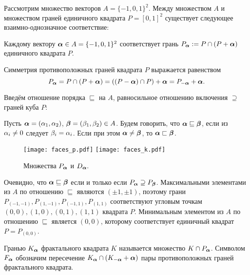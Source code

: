 Рассмотрим множество векторов $A=\{-1,0,1\}^2$.
Между множеством $A$ и множеством граней единичного квадрата $P=[0,1]^2$ существует следующее взаимно-однозначное соответствие:

\begin{definition}\label{dfn:Pa}
Каждому вектору ${\bm{\alpha}}\in A=\{-1,0,1\}^2$ соответствует грань $P_{\bm{\alpha}}:=P\cap(P+{\bm{\alpha}})$ единичного квадрата $P$.
\end{definition}

Симметрия противоположных граней квадрата $P$ выражается равенством 
$$P_{\bm{\alpha}}=P\cap(P+{\bm{\alpha}})=((P-{\bm{\alpha}})\cap P)+{\bm{\alpha}}=P_{-{\bm{\alpha}}}+{\bm{\alpha}}.$$


Введём отношение порядка $\sqsubseteq$ на $A$, равносильное отношению включения $\supseteq$ граней куба $P$:

\begin{definition}\label{Aorder}
Пусть ${\bm{\alpha}}=(\alpha_1,\alpha_2)$, ${\bm{\beta}}=(\beta_1,\beta_2)\in A$.
Будем говорить, что ${\bm{\alpha}}\sqsubseteq{\bm{\beta}}$, если из $\alpha_i\neq 0$ следует $\beta_i=\alpha_i$.
Если при этом ${\bm{\alpha}}\neq{\bm{\beta}}$, то ${\bm{\alpha}}\sqsubset{\bm{\beta}}$.
\end{definition}

\begin{figure}[h!]
 \centering
 \texttt{[image: faces\_p.pdf]}
 \hfill
 \texttt{[image: faces\_k.pdf]}
 \caption{Множества $P_{\bm{\alpha}}$ и $D_{\bm{\alpha}}.$}
 \label{fig:faces}
\end{figure}

Очевидно, что ${\bm{\alpha}}\sqsubseteq{\bm{\beta}}$ если и только если $P_{\bm{\alpha}}\supseteq P_{\bm{\beta}}$. 
Максимальными элементами из $A$ по отношению $\sqsubseteq$ являются $(\pm 1,\pm 1)$, поэтому грани $P_{(-1,-1)}, P_{(1,-1)}, P_{(-1,1)}, P_{(1,1)}$ соответствуют угловым точкам $(0,0), (1,0), (0,1), (1,1)$ квадрата $P$.
Минимальным элементом из $A$ по отношению $\sqsubseteq$ является $(0,0)$, которому соответствует единичный квадрат $P=P_{(0,0)}$.


\begin{definition}\label{def-falpha}
Гранью $K_{\bm{\alpha}}$ фрактального квадрата $K$ называется множество $K\cap P_{\bm{\alpha}}$.
Символом $F_{\bm{\alpha}}$ обозначим пересечение $K_{\bm{\alpha}}\cap(K_{-{\bm{\alpha}}}+{\bm{\alpha}})$ пары противоположных граней фрактального квадрата.
\end{definition}





